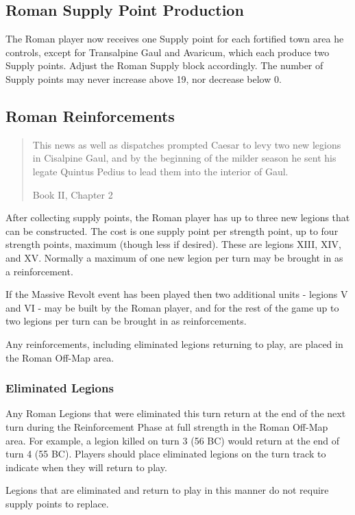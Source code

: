 \subsection{Roman Supply Point Production}
\par
The Roman player now receives one Supply point for each fortified town area he controls, except for Transalpine Gaul and Avaricum, which each produce two Supply points. Adjust the Roman Supply block accordingly. The number of Supply points may never increase above 19, nor decrease below 0.

\subsection{Roman Reinforcements}\label{roman_reinforcements}
\blockquote[Book II, Chapter 2]{This news as well as dispatches prompted Caesar to levy two new legions in Cisalpine Gaul, and by the beginning of the milder season he sent his legate Quintus Pedius to lead them into the interior of Gaul.}
\par
After collecting supply points, the Roman player has up to three new legions that can be constructed. The cost is one supply point per strength point, up to four strength points, maximum (though less if desired). These are legions XIII, XIV, and XV. Normally a maximum of one new legion per turn may be brought in as a reinforcement.

If the Massive Revolt event has been played then two additional units - legions V and VI - may be built by the Roman player, and for the rest of the game up to two legions per turn can be brought in as reinforcements.

Any reinforcements, including eliminated legions returning to play, are placed in the Roman Off-Map area.

\subsubsection{Eliminated Legions}
\par
Any Roman Legions that were eliminated this turn return at the end of the next turn during the Reinforcement Phase at full strength in the Roman Off-Map area. For example, a legion killed on turn 3 (56 BC) would return at the end of turn 4 (55 BC). Players should place eliminated legions on the turn track to indicate when they will return to play.

Legions that are eliminated and return to play in this manner do not require supply points to replace.

